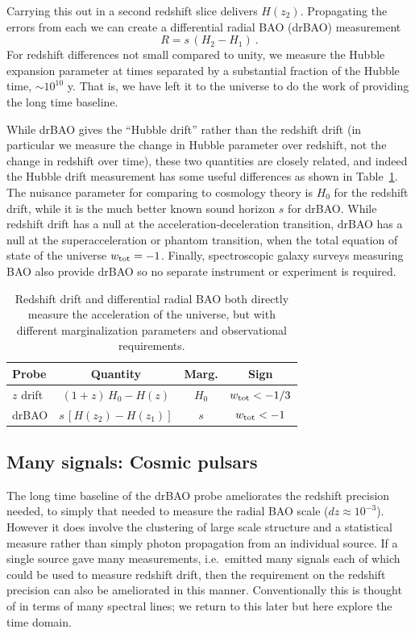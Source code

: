 \documentclass[preprint2, 10pt]{aastex}
\newcommand{\be}{\begin{equation}}
\newcommand{\ee}{\end{equation}}
\begin{document}
Carrying this out in a second redshift slice delivers $H(z_2)$.  Propagating 
the errors from each we can create a differential radial BAO (drBAO) 
measurement 
\be 
R=s\,(H_2-H_1) \ . \label{eq:drbao} 
\ee 
For redshift differences not small compared to unity, we measure the 
Hubble expansion parameter at times separated by a substantial fraction 
of the Hubble time, $\sim10^{10}$ y.  That is, we have left it to the universe 
to do the work of providing the long time baseline.  

While drBAO gives the ``Hubble drift'' rather than the redshift drift 
(in particular we measure the change in Hubble parameter over redshift, 
not the change in redshift over time), these two quantities are 
closely related, and indeed the Hubble drift measurement has some 
useful differences as shown in Table~\ref{tab:drbao}.  The nuisance 
parameter for comparing to cosmology theory is $H_0$ for the redshift 
drift, while it is the much better known sound horizon $s$ for drBAO.  
While redshift drift has a null at the acceleration-deceleration transition, 
drBAO has a null at the superacceleration or phantom transition, when the 
total equation of state of the universe $w_{\rm tot}=-1$.  Finally, 
spectroscopic galaxy surveys measuring BAO also provide drBAO so no 
separate instrument or experiment is required. 


\begin{table}[!htb]
\small 
\begin{tabular}{l|ccc} 
Probe  &  Quantity  & Marg. & Sign \\ 
\hline 
$z$ drift &$(1+z)\,H_0-H(z)$ & $H_0$ & $w_{\rm tot}<-1/3$ \\ 
drBAO & $s\,[H(z_2)-H(z_1)]$ & $s$ & $w_{\rm tot}<-1$ \\ 
\end{tabular} 
\caption{Redshift drift and differential radial BAO both 
directly measure the acceleration of the universe, but with different 
marginalization parameters and observational requirements. 
}
\label{tab:drbao}
\end{table} 


\subsection{Many signals: Cosmic pulsars} 

The long time baseline of the drBAO probe ameliorates the redshift 
precision needed, to simply that needed to measure the radial BAO scale 
($dz\approx10^{-3}$).  However it does involve the clustering of large scale 
structure and a statistical measure rather than simply photon propagation 
from an individual source.  If a single source gave many measurements, 
i.e.\ emitted many signals each of which could be used to measure redshift 
drift, then the requirement on the redshift precision can also be 
ameliorated in this manner.  
Conventionally this is thought of in terms of many spectral lines; we 
return to this later but here explore the time domain. 
\end{document}
